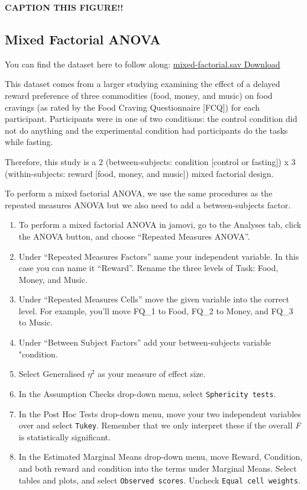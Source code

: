 \documentclass[
]{book}
\begin{document}
\label{fig:unnamed-chunk-2}\textbf{CAPTION THIS FIGURE!!}

\hypertarget{mixed-factorial-anova}{%
\subsection{Mixed Factorial ANOVA}\label{mixed-factorial-anova}}

You can find the dataset here to follow along: \href{https://github.com/danawanzer/stats-with-jamovi/blob/master/data/mixed-factorial.sav}{mixed-factorial.sav Download}

This dataset comes from a larger studying examining the effect of a delayed reward preference of three commodities (food, money, and music) on food cravings (as rated by the Food Craving Questionnaire {[}FCQ{]}) for each participant. Participants were in one of two conditions: the control condition did not do anything and the experimental condition had participants do the tasks while fasting.

Therefore, this study is a 2 (between-subjects: condition {[}control or fasting{]}) x 3 (within-subjects: reward {[}food, money, and music{]}) mixed factorial design.

To perform a mixed factorial ANOVA, we use the same procedures as the repeated measures ANOVA but we also need to add a between-subjects factor.

\begin{enumerate}
\def\labelenumi{\arabic{enumi}.}
\item
  To perform a mixed factorial ANOVA in jamovi, go to the Analyses tab, click the ANOVA button, and choose ``Repeated Measures ANOVA''.
\item
  Under ``Repeated Measures Factors'' name your independent variable. In this case you can name it ``Reward''. Rename the three levels of Task: Food, Money, and Music.
\item
  Under ``Repeated Measures Cells'' move the given variable into the correct level. For example, you'll move FQ\_1 to Food, FQ\_2 to Money, and FQ\_3 to Music.
\item
  Under ``Between Subject Factors'' add your between-subjects variable "condition.
\item
  Select Generalised \(\eta^2\) as your measure of effect size.
\item
  In the Assumption Checks drop-down menu, select \texttt{Sphericity\ tests}.
\item
  In the Post Hoc Tests drop-down menu, move your two independent variables over and select \texttt{Tukey}. Remember that we only interpret these if the overall \emph{F} is statistically significant.
\item
  In the Estimated Marginal Means drop-down menu, move Reward, Condition, and both reward and condition into the terms under Marginal Means. Select tables and plots, and select \texttt{Observed\ scores}. Uncheck \texttt{Equal\ cell\ weights}.
\end{enumerate}
\end{document}
